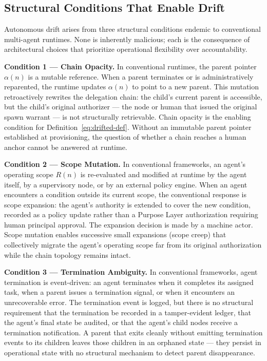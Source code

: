 \subsection{Structural Conditions That Enable Drift}

Autonomous drift arises from three structural conditions endemic to conventional multi-agent runtimes. None is inherently malicious; each is the consequence of architectural choices that prioritize operational flexibility over accountability.

\medskip
\noindent\textbf{Condition 1 — Chain Opacity.}
In conventional runtimes, the parent pointer $\alpha(n)$ is a mutable reference. When a parent terminates or is administratively reparented, the runtime updates $\alpha(n)$ to point to a new parent. This mutation retroactively rewrites the delegation chain: the child's current parent is accessible, but the child's original authorizer — the node or human that issued the original spawn warrant — is not structurally retrievable. Chain opacity is the enabling condition for Definition~\ref{eq:drifted-def}. Without an immutable parent pointer established at provisioning, the question of whether a chain reaches a human anchor cannot be answered at runtime.

\medskip
\noindent\textbf{Condition 2 — Scope Mutation.}
In conventional frameworks, an agent's operating scope $R(n)$ is re-evaluated and modified at runtime by the agent itself, by a supervisory node, or by an external policy engine. When an agent encounters a condition outside its current scope, the conventional response is scope expansion: the agent's authority is extended to cover the new condition, recorded as a policy update rather than a Purpose Layer authorization requiring human principal approval. The expansion decision is made by a machine actor. Scope mutation enables successive small expansions (scope creep) that collectively migrate the agent's operating scope far from its original authorization while the chain topology remains intact.

\medskip
\noindent\textbf{Condition 3 — Termination Ambiguity.}
In conventional frameworks, agent termination is event-driven: an agent terminates when it completes its assigned task, when a parent issues a termination signal, or when it encounters an unrecoverable error. The termination event is logged, but there is no structural requirement that the termination be recorded in a tamper-evident ledger, that the agent's final state be audited, or that the agent's child nodes receive a termination notification. A parent that exits cleanly without emitting termination events to its children leaves those children in an orphaned state — they persist in operational state with no structural mechanism to detect parent disappearance.

